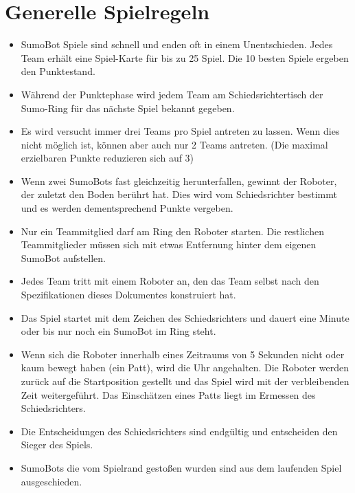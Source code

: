 \documentclass[a4paper,12pt]{article}
\begin{document}
\section{Generelle Spielregeln}
\begin{itemize}
	\item SumoBot Spiele sind schnell und enden oft in einem Unentschieden. Jedes Team erhält eine Spiel-Karte für bis zu 25 Spiel. Die 10 besten Spiele ergeben den Punktestand.
	\item Während der Punktephase wird jedem Team am Schiedsrichtertisch der Sumo-Ring für das nächste Spiel bekannt gegeben.
	\item Es wird versucht immer drei Teams pro Spiel antreten zu lassen. Wenn dies nicht möglich ist, können aber auch nur 2 Teams antreten. (Die maximal erzielbaren Punkte reduzieren sich auf 3) %
	\item Wenn zwei SumoBots fast gleichzeitig herunterfallen, gewinnt der Roboter, der zuletzt den Boden berührt hat. Dies wird vom Schiedsrichter bestimmt und es werden dementsprechend Punkte vergeben.
	\item Nur ein Teammitglied darf am Ring den Roboter starten. Die restlichen Teammitglieder müssen sich mit etwas Entfernung hinter dem eigenen SumoBot aufstellen.
	\item Jedes Team tritt mit einem Roboter an, den das Team selbst nach den Spezifikationen dieses Dokumentes konstruiert hat.
	\item Das Spiel startet mit dem Zeichen des Schiedsrichters und dauert eine Minute oder bis nur noch ein SumoBot im Ring steht.
	\item Wenn sich die Roboter innerhalb eines Zeitraums von 5 Sekunden nicht oder kaum bewegt haben (ein Patt), wird die Uhr angehalten. Die Roboter werden zurück auf die Startposition gestellt und das Spiel wird mit der verbleibenden Zeit weitergeführt. Das Einschätzen eines Patts liegt im Ermessen des Schiedsrichters.
	\item Die Entscheidungen des Schiedsrichters sind endgültig und entscheiden den Sieger des Spiels.
	\item SumoBots die vom Spielrand gestoßen wurden sind aus dem laufenden Spiel ausgeschieden.
\end{itemize}
\end{document}
